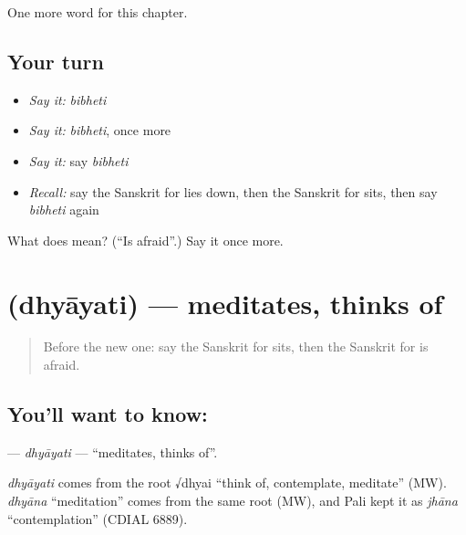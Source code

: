 \begin{grammarlens}[title={What you've built}]
One more word for this chapter.
\end{grammarlens}

\subsection*{Your turn}
\begin{itemize}
\raggedright
  \item \emph{Say it:} \emph{bibheti}
  \item \emph{Say it:} \emph{bibheti}, once more
  \item \emph{Say it:} say \emph{bibheti}
  \item \emph{Recall:} say the Sanskrit for lies down, then the Sanskrit for sits, then say \emph{bibheti} again
\end{itemize}

\begin{tcolorbox}[breakable,colback=teal!4,colframe=teal!35!black,title={Before you move on}]
What does  mean? (\textquotedblleft{}Is afraid\textquotedblright{}.) Say it once more.
\end{tcolorbox}
\section[\texorpdfstring{\sk{ध्यायति} (dhyāyati)}{ध्यायति (dhyāyati)}]{ (dhyāyati) — meditates, thinks of}

\label{lesson:SA-C143-dhyayati}



\begin{quote}
Before the new one: say the Sanskrit for sits, then the Sanskrit for is afraid.
\end{quote}

\subsection*{You'll want to know: }
\textbf{} — \emph{dhyāyati} — \textquotedblleft{}meditates, thinks of\textquotedblright{}.

\begin{cousinweb}
\emph{dhyāyati} comes from the root √dhyai \textquotedblleft{}think of, contemplate, meditate\textquotedblright{} (MW). \emph{dhyāna} \textquotedblleft{}meditation\textquotedblright{} comes from the same root (MW), and Pali kept it as \emph{jhāna} \textquotedblleft{}contemplation\textquotedblright{} (CDIAL 6889).
\end{cousinweb}

